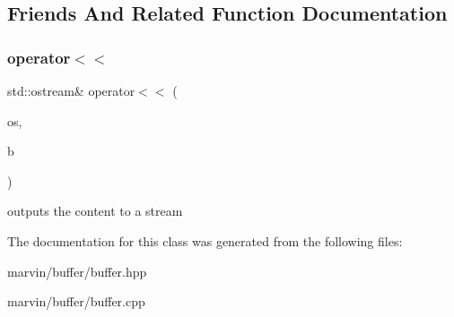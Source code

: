 \subsection{Friends And Related Function Documentation}
\mbox{\label{class_buffer_chain_ae7312cff3464f8365e320c781578ea10}} 
\subsubsection{\texorpdfstring{operator$<$$<$}{operator<<}}
{\footnotesize\ttfamily std\+::ostream\& operator$<$$<$ (\begin{DoxyParamCaption}\item[{std\+::ostream \&}]{os,  }\item[{\hyperlink{class_buffer_chain}{Buffer\+Chain} const \&}]{b }\end{DoxyParamCaption})\hspace{0.3cm}{\ttfamily [friend]}}

outputs the content to a stream 

The documentation for this class was generated from the following files\+:\begin{DoxyCompactItemize}
\item 
marvin/buffer/buffer.\+hpp\item 
marvin/buffer/buffer.\+cpp\end{DoxyCompactItemize}
